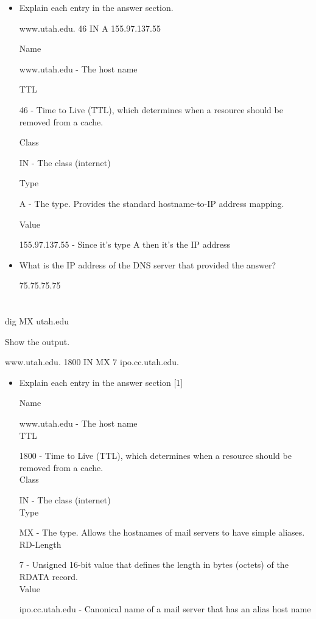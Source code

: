 \documentclass[11pt]{article}
\begin{document}
\begin{itemize}
\item Explain each entry in the answer section.

www.utah.edu. 46 IN A 155.97.137.55

Name

www.utah.edu - The host name


TTL

46 - Time to Live (TTL), which determines when a resource should be removed from a cache.


Class

IN - The class (internet)


Type

A - The type. Provides the standard hostname-to-IP address mapping.

Value

155.97.137.55 - Since it's type A then it's the IP address


\item What is the IP address of the DNS server that provided the answer?

75.75.75.75

\end{itemize}


\section{} dig MX utah.edu

Show the output.

www.utah.edu. 1800 IN MX 7 ipo.cc.utah.edu.

\begin{itemize}
\item Explain each entry in the answer section [1]

Name

www.utah.edu - The host name\\


TTL

1800 - Time to Live (TTL), which determines when a resource should be removed from a cache.\\


Class

IN - The class (internet)\\


Type

MX - The type. Allows the hostnames of mail servers to have simple aliases.\\


RD-Length

7 - Unsigned 16-bit value that defines the length in bytes (octets) of the RDATA record.\\


Value

ipo.cc.utah.edu - Canonical name of a mail server that has an alias host name

\end{itemize}
\end{document}
